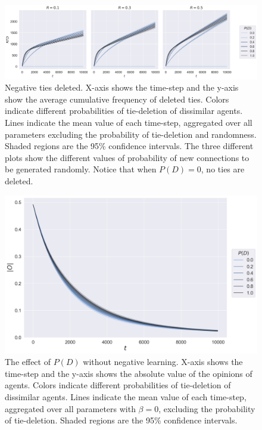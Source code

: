 \documentclass{article}
\begin{document}
\begin{figure}[H]
    \centering
    \includegraphics[width=.8\linewidth]{../plots/overall/Negative_Tie_Deleted.png}
  \caption{Negative ties deleted. X-axis shows the time-step and the y-axis show the average cumulative frequency of deleted ties. Colors indicate different probabilities of tie-deletion of dissimilar agents. Lines indicate the mean value of each time-step, aggregated over all parameters excluding the probability of tie-deletion and randomness. Shaded regions are the 95\% confidence intervals. The three different plots show the different values of probability of new connections to be generated randomly. Notice that when $P(D) = 0$, no ties are deleted.}
  \label{fig:ntd}
\end{figure}

\begin{figure}[H]
    \centering
    \includegraphics[width=.8\linewidth]{../plots/overall/Absolute_Opinion_Tie_Deletion_Without_Negative.png}
  \caption{The effect of $P(D)$ without negative learning. X-axis shows the time-step and the y-axis shows the absolute value of the opinions of agents. Colors indicate different probabilities of tie-deletion of dissimilar agents. Lines indicate the mean value of each time-step, aggregated over all parameters with $\beta = 0$, excluding the probability of tie-deletion. Shaded regions are the 95\% confidence intervals.}
  \label{fig:pd_no_negative}
\end{figure}
\end{document}
